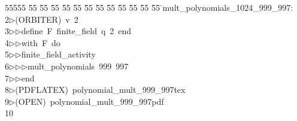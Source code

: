 %
%
\begin{tabbing}
55555 \= 55 \= 55 \= 55 \= 55 \= 55 \= 55 \= 55 \= 55 \= 55 \= 55 \= 55 \= 55 \= \>mult\_polynomials\_1024\_999\_997:\\[0pt]
2\>$\triangleright$\>(ORBITER)\ v\ 2\ \\[0pt]
3\>$\triangleright$\>$\triangleright$\>define\ F\ finite\_field\ q\ 2\ end\ \\[0pt]
4\>$\triangleright$\>$\triangleright$\>with\ F\ do\ \\[0pt]
5\>$\triangleright$\>$\triangleright$\>finite\_field\_activity\ \\[0pt]
6\>$\triangleright$\>$\triangleright$\>$\triangleright$\>mult\_polynomials\ 999\ 997\ \\[0pt]
7\>$\triangleright$\>$\triangleright$\>end\\[0pt]
8\>$\triangleright$\>(PDFLATEX)\ polynomial\_mult\_999\_997tex\\[0pt]
9\>$\triangleright$\>(OPEN)\ polynomial\_mult\_999\_997pdf\\[0pt]
10\>\end{tabbing}
